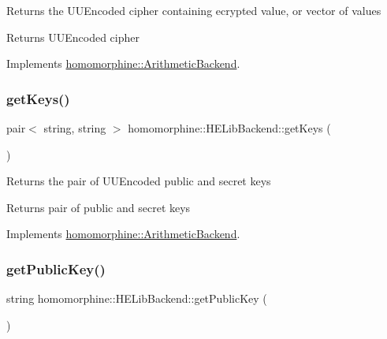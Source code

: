 Returns the U\+U\+Encoded cipher containing ecrypted value, or vector of values

\begin{DoxyReturn}{Returns}
U\+U\+Encoded cipher 
\end{DoxyReturn}


Implements \mbox{\hyperlink{classhomomorphine_1_1_arithmetic_backend_acf38918fb556703ccb12b63dc73b15ed}{homomorphine\+::\+Arithmetic\+Backend}}.

\mbox{\label{classhomomorphine_1_1_h_e_lib_backend_ab45838cc01a4e71425e2aa0279e12c0e}} 
\subsubsection{\texorpdfstring{getKeys()}{getKeys()}}
{\footnotesize\ttfamily pair$<$ string, string $>$ homomorphine\+::\+H\+E\+Lib\+Backend\+::get\+Keys (\begin{DoxyParamCaption}{ }\end{DoxyParamCaption})\hspace{0.3cm}{\ttfamily [virtual]}}

Returns the pair of U\+U\+Encoded public and secret keys

\begin{DoxyReturn}{Returns}
pair of public and secret keys 
\end{DoxyReturn}


Implements \mbox{\hyperlink{classhomomorphine_1_1_arithmetic_backend_a71bb86054685708001c636e3085d578c}{homomorphine\+::\+Arithmetic\+Backend}}.

\mbox{\label{classhomomorphine_1_1_h_e_lib_backend_a8b096d4780f3b65f0fa0cb3ca6cb9ab8}} 
\subsubsection{\texorpdfstring{getPublicKey()}{getPublicKey()}}
{\footnotesize\ttfamily string homomorphine\+::\+H\+E\+Lib\+Backend\+::get\+Public\+Key (\begin{DoxyParamCaption}{ }\end{DoxyParamCaption})\hspace{0.3cm}{\ttfamily [virtual]}}

